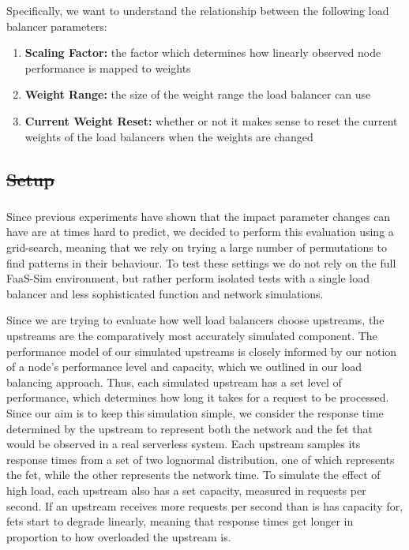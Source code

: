 \documentclass[draft,final]{vutinfth} %
\providecommand{\DIFaddtex}[1]{{\protect\color{blue}\uwave{#1}}} %
\providecommand{\DIFdeltex}[1]{{\protect\color{red}\sout{#1}}}                      %
\providecommand{\DIFaddbegin}{} %
\providecommand{\DIFaddend}{} %
\providecommand{\DIFdelbegin}{} %
\providecommand{\DIFdelend}{} %
\providecommand{\DIFadd}[1]{\texorpdfstring{\DIFaddtex{#1}}{#1}} %
\providecommand{\DIFdel}[1]{\texorpdfstring{\DIFdeltex{#1}}{}} %
\begin{document}
Specifically, we want to understand the relationship between the following load balancer parameters:
\begin{enumerate}
    \item \textbf{Scaling Factor:} the factor which determines how linearly observed node performance is mapped to weights
    \item \textbf{Weight Range:} the size of the weight range the load balancer can use
    \item \textbf{Current Weight Reset:} whether or not it makes sense to reset the current weights of the load balancers when the weights are changed
\end{enumerate}

\DIFdelbegin \subsection{\DIFdel{Setup}}
\addtocounter{subsection}{-1}%
\DIFdelend \DIFaddbegin \subsubsection{\DIFadd{Setup}}
\DIFaddend 

Since previous experiments have shown that the impact parameter changes can have are at times hard to predict, we decided to perform this evaluation using a grid-search, meaning that we rely on trying a large number of permutations to find patterns in their behaviour.
To test these settings we do not rely on the full FaaS-Sim environment, but rather perform isolated tests with a single load balancer and less sophisticated function and network simulations.

Since we are trying to evaluate how well load balancers choose upstreams, the upstreams are the comparatively most accurately simulated component.
The performance model of our simulated upstreams is closely informed by our notion of a node's performance level and capacity, which we outlined in our load balancing approach.
Thus, each simulated upstream has a set level of performance, which determines how long it takes for a request to be processed.
Since our aim is to keep this simulation simple, we consider the response time determined by the upstream to represent both the network and the \gls{fet} that would be observed in a real serverless system.
Each upstream samples its response times from a set of two lognormal distribution, one of which represents the \gls{fet}, while the other represents the network time.
To simulate the effect of high load, each upstream also has a set capacity, measured in requests per second.
If an upstream receives more requests per second than is has capacity for, \glspl{fet} start to degrade linearly, meaning that response times get longer in proportion to how overloaded the upstream is.
\end{document}
